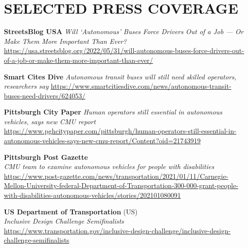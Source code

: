 \documentclass[11pt]{article} %
\begin{document}

\section*{SELECTED PRESS COVERAGE}

\textbf{StreetsBlog USA}
\textit{Will ‘Autonomous’ Buses Force Drivers Out of a Job — Or Make Them More Important Than Ever?}
\sloppy
\href{https://usa.streetsblog.org/2022/05/31/will-autonomous-buses-force-drivers-out-of-a-job-or-make-them-more-important-than-ever/}{https://usa.streetsblog.org/2022/05/31/will-autonomous-buses-force-drivers-out-of-a-job-or-make-them-more-important-than-ever/}

\textbf{Smart Cites Dive}
\textit{Autonomous transit buses will still need skilled operators, researchers say}
\href{https://www.smartcitiesdive.com/news/autonomous-transit-buses-need-drivers/624053/}{https://www.smartcitiesdive.com/news/autonomous-transit-buses-need-drivers/624053/}

\textbf{Pittsburgh City Paper}
\textit{Human operators still essential in autonomous vehicles, says new CMU report}
\href{https://www.pghcitypaper.com/pittsburgh/human-operators-still-essential-in-autonomous-vehicles-says-new-cmu-report/Content?oid=21743919}{https://www.pghcitypaper.com/pittsburgh/human-operators-still-essential-in-autonomous-vehicles-says-new-cmu-report/Content?oid=21743919}

 \textbf{Pittsburgh Post Gazette}\\
\textit{CMU team to examine autonomous vehicles for people with disabilities}\\
\sloppy
\href{https://www.post-gazette.com/news/transportation/2021/01/11/Carnegie-Mellon-University-federal-Department-of-Transportation-300-000-grant-people-with-disabilities-autonomous-vehicles/stories/202101080091}{https://www.post-gazette.com/news/transportation/2021/01/11/Carnegie-Mellon-University-federal-Department-of-Transportation-300-000-grant-people-with-disabilities-autonomous-vehicles/stories/202101080091}
\medskip

 \textbf{US Department of Transportation} (US)\\
\textit{Inclusive Design Challenge Semifinalists}\\
\href{https://www.transportation.gov/inclusive-design-challenge/inclusive-design-challenge-semifinalists}{https://www.transportation.gov/inclusive-design-challenge/inclusive-design-challenge-semifinalists}
\end{document}
